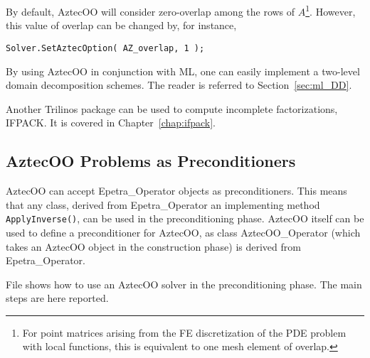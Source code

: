 By default, AztecOO will consider zero-overlap among the rows of
$A$\footnote{For point matrices arising from the FE discretization of
  the PDE problem with local functions, this is equivalent to one mesh
  element of overlap.}. However, this value of overlap can be changed by,
for instance,
\begin{verbatim}
Solver.SetAztecOption( AZ_overlap, 1 );
\end{verbatim}

\begin{remark} By using AztecOO in conjunction with ML, one can easily
  implement a two-level domain decomposition schemes. The reader is
  referred to Section~\ref{sec:ml_DD}.
\end{remark}

\begin{remark} Another Trilinos package can be used to compute
  incomplete factorizations, IFPACK. It is covered in
  Chapter~\ref{chap:ifpack}.
\end{remark}



\subsection{AztecOO Problems as Preconditioners}
\label{sec:prec_aztecoo}

AztecOO can accept Epetra\_Operator objects as preconditioners. This
means that any class, derived from Epetra\_Operator an implementing
method \verb!ApplyInverse()!, can be used in the preconditioning
phase. AztecOO itself can be used to define a preconditioner for
AztecOO, as class AztecOO\_Operator (which takes an AztecOO object in
the construction phase) is derived from Epetra\_Operator.

File  shows how to use an AztecOO solver in the
preconditioning phase.  The main steps are here reported.

